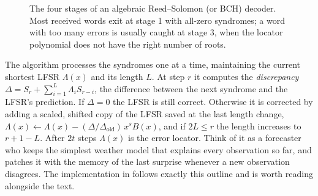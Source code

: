 \begin{figure}[htbp]\centering
{}
\caption{The four stages of an algebraic Reed--Solomon (or BCH) decoder. Most received words exit at
stage 1 with all-zero syndromes; a word with too many errors is usually caught at stage 3, when the
locator polynomial does not have the right number of roots.}
\label{fig:ch14_rs_pipeline}
\end{figure}

\begin{deeper}
The algorithm processes the syndromes one at a time, maintaining the current shortest LFSR
$\Lambda(x)$ and its length $L$. At step $r$ it computes the \emph{discrepancy}
$\Delta=S_r+\sum_{i=1}^{L}\Lambda_iS_{r-i}$, the difference between the next syndrome and the LFSR's
prediction. If $\Delta=0$ the LFSR is still correct. Otherwise it is corrected by adding a scaled,
shifted copy of the LFSR saved at the last length change,
$\Lambda(x)\leftarrow\Lambda(x)-(\Delta/\Delta_{\text{old}})\,x^{s}B(x)$, and if $2L\le r$ the length
increases to $r+1-L$. After $2t$ steps $\Lambda(x)$ is the error locator. Think of it as a forecaster
who keeps the simplest weather model that explains every observation so far, and patches it with the
memory of the last surprise whenever a new observation disagrees. The implementation in
 follows exactly this outline and is worth reading alongside the text.
\end{deeper}

